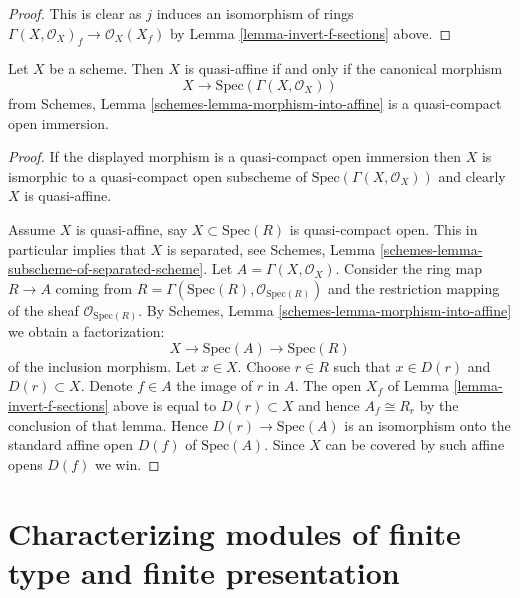 \begin{proof}
This is clear as $j$ induces an isomorphism of rings
$\Gamma(X, \mathcal{O}_X)_f \to \mathcal{O}_X(X_f)$ by
Lemma \ref{lemma-invert-f-sections} above.
\end{proof}

\begin{lemma}
\label{lemma-quasi-affine}
Let $X$ be a scheme. Then $X$ is quasi-affine if and only if
the canonical morphism
$$
X \longrightarrow \text{Spec}(\Gamma(X, \mathcal{O}_X))
$$
from Schemes, Lemma \ref{schemes-lemma-morphism-into-affine} is
a quasi-compact open immersion.
\end{lemma}

\begin{proof}
If the displayed morphism is a quasi-compact open immersion then
$X$ is ismorphic to a quasi-compact open subscheme of
$\text{Spec}(\Gamma(X, \mathcal{O}_X))$ and clearly $X$ is quasi-affine.

\medskip\noindent
Assume $X$ is quasi-affine, say $X \subset \text{Spec}(R)$ is
quasi-compact open. This in particular implies that $X$ is
separated, see
Schemes, Lemma \ref{schemes-lemma-subscheme-of-separated-scheme}.
Let $A = \Gamma(X, \mathcal{O}_X)$.
Consider the ring map $R \to A$ coming from
$R = \Gamma(\text{Spec}(R), \mathcal{O}_{\text{Spec}(R)})$
and the restriction mapping of the sheaf $\mathcal{O}_{\text{Spec}(R)}$.
By Schemes, Lemma \ref{schemes-lemma-morphism-into-affine}
we obtain a factorization:
$$
X \longrightarrow
\text{Spec}(A) \longrightarrow
\text{Spec}(R)
$$
of the inclusion morphism. Let $x \in X$. Choose $r \in R$ such that
$x \in D(r)$ and $D(r) \subset X$. Denote $f \in A$ the image of $r$
in $A$. The open $X_f$ of Lemma \ref{lemma-invert-f-sections}
above is equal to $D(r) \subset X$ and hence $A_f \cong R_r$ by the
conclusion of that lemma.
Hence $D(r) \to \text{Spec}(A)$ is an isomorphism onto the
standard affine open $D(f)$ of $\text{Spec}(A)$. Since $X$
can be covered by such affine opens $D(f)$ we win.
\end{proof}









\section{Characterizing modules of finite type and finite presentation}
\label{section-characterizing-finite-type-presentation}

